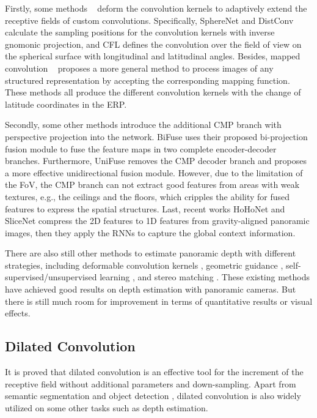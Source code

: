 \documentclass[letterpaper]{article} \usepackage{aaai21}  \usepackage{times}  \usepackage{helvet} \usepackage{courier}  \usepackage[hyphens]{url}  \usepackage{graphicx} \urlstyle{rm} \def\UrlFont{\rm}  \usepackage{natbib}  \usepackage{caption} \frenchspacing  \setlength{\pdfpagewidth}{8.5in}  \setlength{\pdfpageheight}{11in}
\begin{document}
Firstly, some methods ~\cite{DBLP:conf/eccv/CoorsCG18,DBLP:conf/eccv/TatenoNT18,DBLP:journals/ral/Fernandez-Labrador20,DBLP:journals/corr/abs-1906-11096} deform the convolution kernels to adaptively extend the receptive fields of custom convolutions. Specifically, SphereNet \cite{DBLP:conf/eccv/CoorsCG18} and DistConv \cite{DBLP:conf/eccv/TatenoNT18} calculate the sampling positions for the convolution kernels with inverse gnomonic projection, and CFL \cite{DBLP:journals/ral/Fernandez-Labrador20} defines the convolution over the field of view on the spherical surface with longitudinal and latitudinal angles.
Besides, mapped convolution ~\cite{DBLP:journals/corr/abs-1906-11096} proposes a more general method to process images of any structured representation by accepting the corresponding mapping function.
These methods all produce the different convolution kernels with the change of latitude coordinates in the ERP.

Secondly, some other methods introduce the additional CMP branch with perspective projection into the network. BiFuse uses their proposed bi-projection fusion module to fuse the feature maps in two complete encoder-decoder branches. Furthermore, UniFuse removes the CMP decoder branch and proposes a more effective unidirectional fusion module. However, due to the limitation of the FoV, the CMP branch can not extract good features from areas with weak textures, e.g., the ceilings and the floors, which cripples the ability for fused features to express the spatial structures.
Last, recent works HoHoNet and SliceNet compress the 2D features to 1D features from gravity-aligned panoramic images, then they apply the RNNs to capture the global context information.

There are also still other methods to estimate panoramic depth with different strategies, including deformable convolution kernels \cite{DBLP:conf/icra/ChengWZGY20,DBLP:journals/spl/ChenLFLCG21}, geometric guidance \cite{DBLP:conf/3dim/EderMG19,DBLP:conf/cvpr/JinXZZTXYG20,DBLP:conf/eccv/ZengKG20}, self-supervised/unsupervised learning \cite{DBLP:conf/3dim/ZioulisKZAD19,DBLP:conf/itsc/ZhouWY20}, and stereo matching \cite{DBLP:conf/icra/WangSTCS20}.
These existing methods have achieved good results on depth estimation with panoramic cameras. But there is still much room for improvement in terms of quantitative results or visual effects.

\subsection{Dilated Convolution}
It is proved that dilated convolution is an effective tool for the increment of the receptive field without additional parameters and down-sampling. Apart from semantic segmentation \cite{DBLP:journals/pami/ChenPKMY18} and object detection \cite{DBLP:conf/eccv/LiuAESRFB16}, dilated convolution is also widely utilized on some other tasks such as depth estimation.
\end{document}
